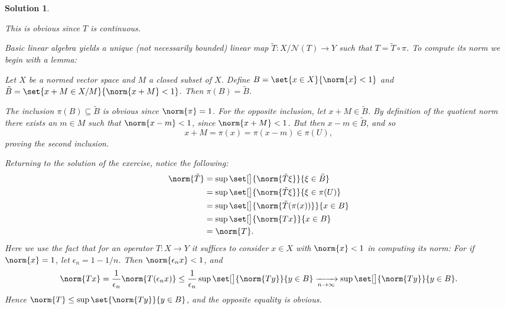 \documentclass[article, a4paper, 11pt, oneside]{memoir}
\numberwithin{equation}{chapter}
\newcommand{\calN}{\mathcal{N}}
\newenvironment{displaytheorem}{%
	\begin{displayquote}\itshape%
}{%
	\end{displayquote}%
}
\theoremstyle{nonumberplain}
\newtheorem{solution}{Solution}
\begin{document}
\begin{solution}
\begin{solutionsec}
	\item This is obvious since $T$ is continuous.
	
	\item Basic linear algebra yields a unique (not necessarily bounded) linear map $\tilde{T} \colon X/\calN(T) \to Y$ such that $T = \tilde{T} \circ \pi$. To compute its norm we begin with a lemma:
	\begin{displaytheorem}
		Let $X$ be a normed vector space and $M$ a closed subset of $X$. Define $B = \set{x \in X}{ \norm{x} < 1 }$ and $\tilde{B} = \set{x + M \in X/M}{ \norm{x+M} < 1 }$. Then $\pi(B) = \tilde{B}$.
	\end{displaytheorem}
	The inclusion $\pi(B) \subseteq \tilde{B}$ is obvious since $\norm{\pi} = 1$. For the opposite inclusion, let $x + M \in \tilde{B}$. By definition of the quotient norm there exists an $m \in M$ such that $\norm{x - m} < 1$, since $\norm{x + M} < 1$. But then $x - m \in \tilde{B}$, and so
	\begin{equation*}
		x + M
			= \pi(x)
			= \pi(x - m)
			\in \pi(U),
	\end{equation*}
	proving the second inclusion.

	Returning to the solution of the exercise, notice the following:
	\begin{align*}
		\norm{\tilde{T}}
			&= \sup\set[\big]{ \norm{\tilde{T}\xi} }{\xi \in \tilde{B}} \\
			&= \sup\set[\big]{ \norm{\tilde{T}\xi} }{\xi \in \pi(U)} \\
			&= \sup\set[\big]{ \norm{\tilde{T}(\pi(x))} }{x \in B} \\
			&= \sup\set[\big]{ \norm{Tx} }{x \in B} \\
			&= \norm{T}.
	\end{align*}
	Here we use the fact that for an operator $T \colon X \to Y$ it suffices to consider $x \in X$ with $\norm{x} < 1$ in computing its norm: For if $\norm{x} = 1$, let $\epsilon_n = 1 - 1/n$. Then $\norm{\epsilon_n x} < 1$, and
	\begin{equation*}
		\norm{Tx}
			= \frac{1}{\epsilon_n} \norm{T(\epsilon_n x)}
			\leq \frac{1}{\epsilon_n} \sup\set[\big]{ \norm{Ty} }{y \in B}
			\xrightarrow[n\to\infty]{} \sup\set[\big]{ \norm{Ty} }{y \in B}.
	\end{equation*}
	Hence $\norm{T} \leq \sup\set{ \norm{Ty} }{y \in B}$, and the opposite equality is obvious.
\end{solutionsec}
\end{solution}
\end{document}
